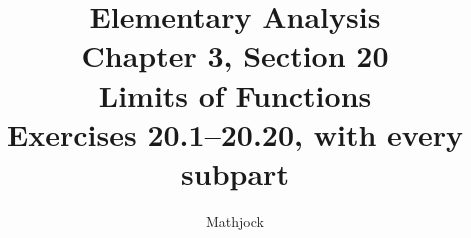 
\title{\textbf{Elementary Analysis}\\[0.3em]
Chapter 3, Section 20\\[0.3em]
\large Limits of Functions\\
Exercises 20.1--20.20, with every subpart}
\author{Mathjock}
\date{}

\maketitle
\bookinfo
\tableofcontents
\clearpage
\setcounter{section}{19}


